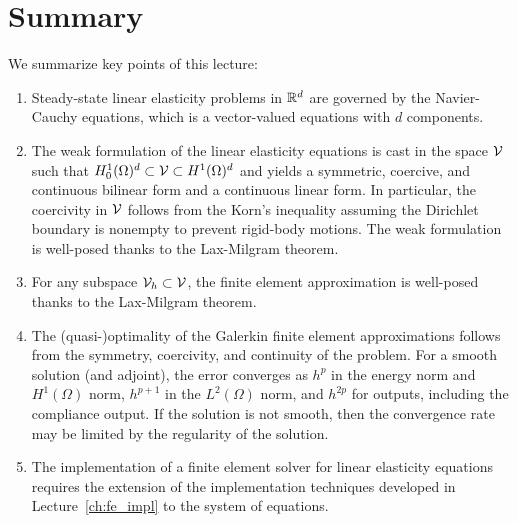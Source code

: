 \section{Summary}
We summarize key points of this lecture:
\begin{enumerate}
\item Steady-state linear elasticity problems in $\mathbb{R}^d$ are governed by the Navier-Cauchy equations, which is a vector-valued equations with $d$ components.
\item The weak formulation of the linear elasticity equations is cast in the space $\mathcal{V}$ such that $H^1_0(\Omega)^d \subset \mathcal{V} \subset H^1(\Omega)^d$ and yields a symmetric, coercive, and continuous bilinear form and a continuous linear form.  In particular, the coercivity in $\mathcal{V}$ follows from the Korn's inequality assuming the Dirichlet boundary is nonempty to prevent rigid-body motions.  The weak formulation is well-posed thanks to the Lax-Milgram theorem.
\item For any subspace $\mathcal{V}_h \subset \mathcal{V}$, the finite element approximation is well-posed thanks to the Lax-Milgram theorem.
\item The (quasi-)optimality of the Galerkin finite element approximations follows from the symmetry, coercivity, and continuity of the problem. For a smooth solution (and adjoint), the error converges as $h^p$ in the energy norm and $H^1(\Omega)$ norm, $h^{p+1}$ in the $L^2(\Omega)$ norm, and $h^{2p}$ for outputs, including the compliance output.  If the solution is not smooth, then the convergence rate may be limited by the regularity of the solution.
\item The implementation of a finite element solver for linear elasticity equations requires the extension of the implementation techniques developed in Lecture~\ref{ch:fe_impl} to the system of equations.
\end{enumerate}


